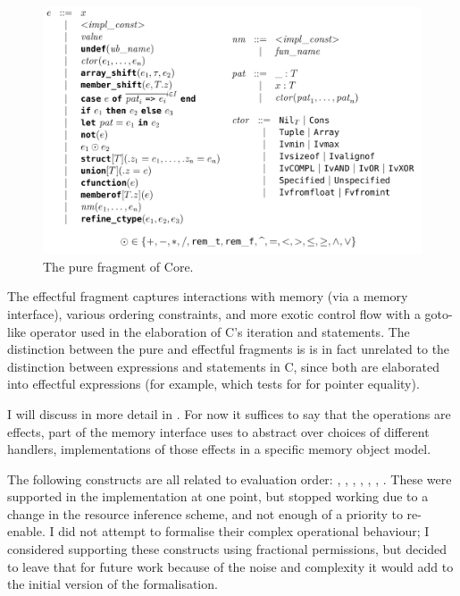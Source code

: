 \begin{figure}[tp]
    \ContinuedFloat*
    \includegraphics{figures/pure-core.png}
    \caption{The pure fragment of Core.}\label{fig:pure-core-grammar}
\end{figure}

The effectful fragment captures interactions with memory (via a memory
interface), various ordering constraints, and more exotic control flow with a
goto-like operator used in the elaboration of C's iteration and 
statements. The distinction between the pure and effectful fragments is is in
fact unrelated to the distinction between expressions and statements in C,
since both are elaborated into effectful expressions (for example,
 which tests for for pointer equality).

I will discuss  in more detail in %
. For now it suffices to say that the
operations are effects, part of the memory interface  uses to abstract
over choices of different handlers, implementations of those effects in a
specific memory object model.

The following constructs are all related to evaluation order:
, , , %
, , , %
. These were supported in the implementation at one %
point, but stopped working due to a change
in the resource inference scheme, and not enough of a priority to re-enable. I
did not attempt to formalise their complex operational behaviour;
I considered supporting these constructs using fractional permissions,
but decided to leave that for future work because of the noise and complexity
it would add to the initial version of the formalisation.


